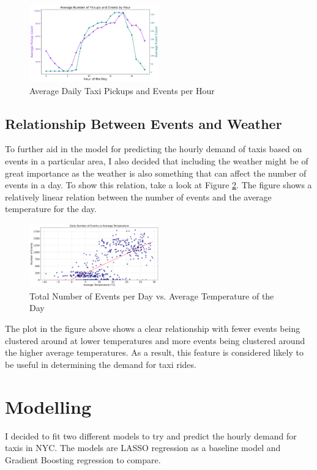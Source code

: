 \documentclass[11pt]{article}
\begin{document}
\begin{figure}[h]
    \includegraphics[width=0.5\textwidth]{plots/average_events_pu_hour.png}
    \centering
    \caption{Average Daily Taxi Pickups and Events per Hour}
    \label{fig:events_vs_pickups}
\end{figure}

\subsection{Relationship Between Events and Weather}
To further aid in the model for predicting the hourly demand of taxis based on events in a particular area, I also decided that including the weather might be of great importance as the weather is also something that can affect the number of events in a day. To show this relation, take a look at Figure \ref{fig:events_vs_weather}. The figure shows a relatively linear relation between the number of events and the average temperature for the day. 

\begin{figure}[h]
    \includegraphics[width=0.5\textwidth]{plots/average_temp_events.png}
    \centering
    \caption{Total Number of Events per Day vs. Average Temperature of the Day}
    \label{fig:events_vs_weather}
\end{figure}

The plot in the figure above shows a clear relationship with fewer events being clustered around at lower temperatures and more events being clustered around the higher average temperatures. As a result, this feature is considered likely to be useful in determining the demand for taxi rides.

\section{Modelling}
\label{sec:modelling}
I decided to fit two different models to try and predict the hourly demand for taxis in NYC. The models are LASSO regression as a baseline model and Gradient Boosting regression to compare.
\end{document}
